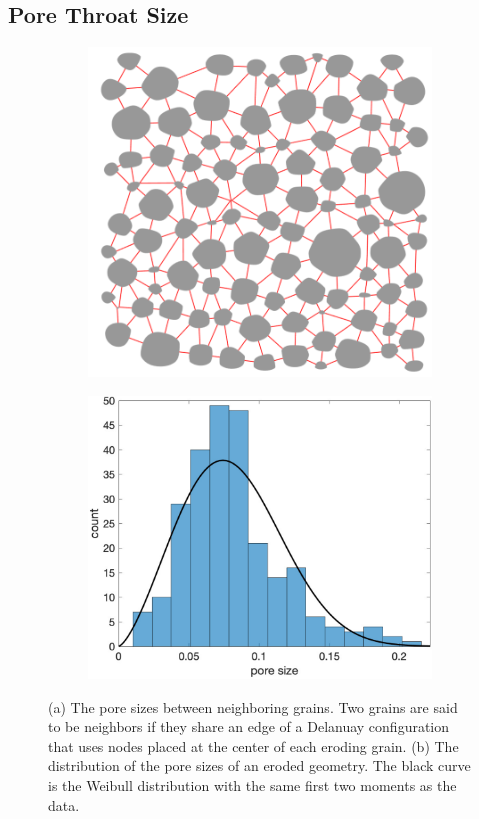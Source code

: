 \documentclass[preprint,10pt]{elsarticle}
\begin{document}
\subsection{Pore Throat Size}
\label{sec:throats}
\begin{figure}[H]
\begin{subfigure}[b]{0.5\textwidth}
\includegraphics*[height =0.8\linewidth]{./figs/triangulation_100b100}
\caption{}
\end{subfigure}
\begin{subfigure}[b]{0.5\textwidth}
\includegraphics*[height = 0.8\linewidth]{./figs/gap_hist100b100}
\caption{}
\end{subfigure}
\caption{\label{fig:Eroding100gap} (a) The pore sizes between
neighboring grains. Two grains are said to be neighbors if they share an
edge of a Delanuay configuration that uses nodes placed at the center of
each eroding grain. (b) The distribution of the pore sizes of an eroded
geometry. The black curve is the Weibull distribution with the same
first two moments as the data.}
\end{figure}
\end{document}
